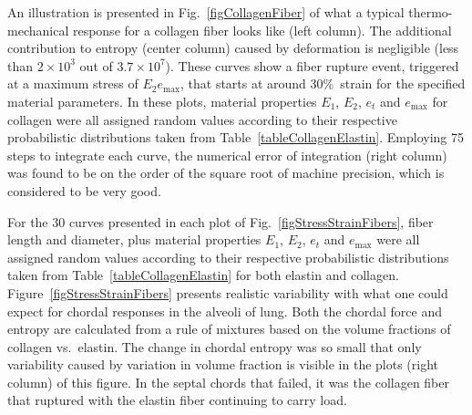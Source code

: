 An illustration is presented in Fig.~\ref{figCollagenFiber} of what a typical thermo-mechanical response for a collagen fiber looks like (left column).  The additional contribution to entropy (center column) caused by deformation is negligible (less than $2 \times 10^3$ out of $3.7 \times 10^7$). These curves show a fiber rupture event, triggered at a maximum stress of $E_2 e_{\max}$, that starts at around 30\%\ strain for the specified material parameters.  In these plots, material properties  $E_1$, $E_2$, $e_t$ and $e_{\max}$ for collagen were all assigned random values according to their respective probabilistic distributions taken from Table~\ref{tableCollagenElastin}.  Employing 75 steps to integrate each curve, the numerical error of integration (right column) was found to be on the order of the square root of machine precision, which is considered to be very good.

For the 30 curves presented in each plot of Fig.~\ref{figStressStrainFibers}, fiber length and diameter, plus material properties $E_1$, $E_2$, $e_t$ and $e_{\max}$ were all assigned random values according to their respective probabilistic distributions taken from Table~\ref{tableCollagenElastin} for both elastin and collagen.  Figure~\ref{figStressStrainFibers} presents realistic variability with what one could expect for chordal responses in the alveoli of lung.  Both the chordal force and entropy are calculated from a rule of mixtures based on the volume fractions of collagen vs.\ elastin.  The change in chordal entropy was so small that only variability caused by variation in volume fraction is visible in the plots (right column) of this figure.  In the septal chords that failed, it was the collagen fiber that ruptured with the elastin fiber continuing to carry load.  

